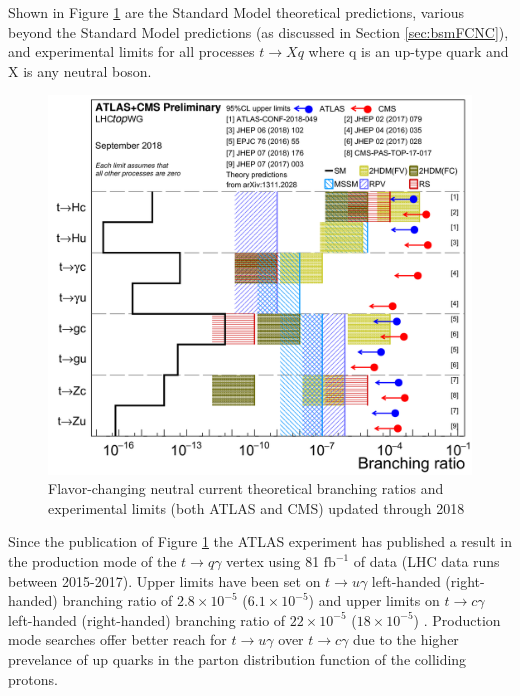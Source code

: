 Shown in Figure \ref{fig:FCNClimits} are the Standard Model theoretical predictions, various beyond the Standard Model predictions (as discussed in Section \ref{sec:bsmFCNC}), and experimental limits for all processes $t\rightarrow Xq$ where q is an up-type quark and X is any neutral boson.  
\begin{figure}[h!]
	\centering
	\includegraphics[width=.9\columnwidth]{../ThesisImages/Theory/AllFCNCLimits.png}
	\caption{Flavor-changing neutral current theoretical branching ratios and experimental limits (both ATLAS and CMS) updated through 2018 \cite{TopWG} }
	\label{fig:FCNClimits}
\end{figure}

Since the publication of Figure \ref{fig:FCNClimits} the ATLAS experiment has published a result in the production mode of the $t\rightarrow q\gamma$ vertex using 81 $\text{fb}^{-1}$ of data (LHC data runs between 2015-2017).  Upper limits have been set on $t\rightarrow u \gamma$ left-handed (right-handed) branching ratio of $2.8\times 10^{-5}$ ($6.1\times 10^{-5}$) and upper limits on $t \rightarrow c \gamma$ left-handed (right-handed) branching ratio of $22\times10^{-5}$ ($18\times10^{-5}$) \cite{GregorFCNC}.  Production mode searches offer better reach for $t\rightarrow u \gamma$ over $t\rightarrow c \gamma$ due to the higher prevelance of up quarks in the parton distribution function of the colliding protons.

